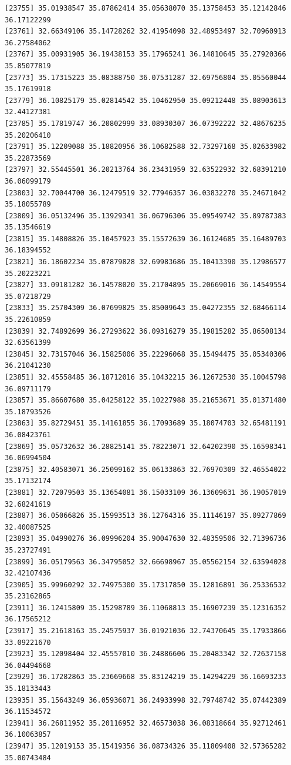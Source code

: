 \documentclass[
  letterpaper,
  DIV=11,
  numbers=noendperiod]{scrartcl}
\begin{document}
\begin{verbatim}
[23755] 35.01938547 35.87862414 35.05638070 35.13758453 35.12142846 36.17122299
[23761] 32.66349106 35.14728262 32.41954098 32.48953497 32.70960913 36.27584062
[23767] 35.00931905 36.19438153 35.17965241 36.14810645 35.27920366 35.85077819
[23773] 35.17315223 35.08388750 36.07531287 32.69756804 35.05560044 35.17619918
[23779] 36.10825179 35.02814542 35.10462950 35.09212448 35.08903613 32.44127381
[23785] 35.17819747 36.20802999 33.08930307 36.07392222 32.48676235 35.20206410
[23791] 35.12209088 35.18820956 36.10682588 32.73297168 35.02633982 35.22873569
[23797] 32.55445501 36.20213764 36.23431959 32.63522932 32.68391210 36.06099179
[23803] 32.70044700 36.12479519 32.77946357 36.03832270 35.24671042 35.18055789
[23809] 36.05132496 35.13929341 36.06796306 35.09549742 35.89787383 35.13546619
[23815] 35.14808826 35.10457923 35.15572639 36.16124685 35.16489703 36.18394552
[23821] 36.18602234 35.07879828 32.69983686 35.10413390 35.12986577 35.20223221
[23827] 33.09181282 36.14578020 35.21704895 35.20669016 36.14549554 35.07218729
[23833] 35.25704309 36.07699825 35.85009643 35.04272355 32.68466114 35.22610859
[23839] 32.74892699 36.27293622 36.09316279 35.19815282 35.86508134 32.63561399
[23845] 32.73157046 36.15825006 35.22296068 35.15494475 35.05340306 36.21041230
[23851] 32.45558485 36.18712016 35.10432215 36.12672530 35.10045798 36.09711179
[23857] 35.86607680 35.04258122 35.10227988 35.21653671 35.01371480 35.18793526
[23863] 35.82729451 35.14161855 36.17093689 35.18074703 32.65481191 36.08423761
[23869] 35.05732632 36.28825141 35.78223071 32.64202390 35.16598341 36.06994504
[23875] 32.40583071 36.25099162 35.06133863 32.76970309 32.46554022 35.17132174
[23881] 32.72079503 35.13654081 36.15033109 36.13609631 36.19057019 32.68241619
[23887] 36.05066826 35.15993513 36.12764316 35.11146197 35.09277869 32.40087525
[23893] 35.04990276 36.09996204 35.90047630 32.48359506 32.71396736 35.23727491
[23899] 36.05179563 36.34795052 32.66698967 35.05562154 32.63594028 32.42107436
[23905] 35.99960292 32.74975300 35.17317850 35.12816891 36.25336532 35.23162865
[23911] 36.12415809 35.15298789 36.11068813 35.16907239 35.12316352 36.17565212
[23917] 35.21618163 35.24575937 36.01921036 32.74370645 35.17933866 33.09221670
[23923] 35.12098404 32.45557010 36.24886606 35.20483342 32.72637158 36.04494668
[23929] 36.17282863 35.23669668 35.83124219 35.14294229 36.16693233 35.18133443
[23935] 35.15643249 36.05936071 36.24933998 32.79748742 35.07442389 36.11534572
[23941] 36.26811952 35.20116952 32.46573038 36.08318664 35.92712461 36.10063857
[23947] 35.12019153 35.15419356 36.08734326 35.11809408 32.57365282 35.00743484

\end{verbatim}
\end{document}
